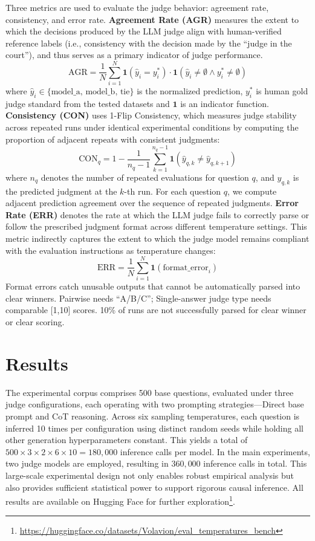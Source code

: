 \documentclass[11pt]{article}
\begin{document}
Three metrics are used to evaluate the judge behavior: agreement rate, consistency, and error rate. 
\textbf{Agreement Rate (AGR)} measures the extent to which the decisions produced by the LLM judge align with human-verified reference labels (i.e., consistency with the decision made by the ``judge in the court''), and thus serves as a primary indicator of judge performance.
$$
\text{AGR} = \frac{1}{N}\sum_{i=1}^N \mathbf{1}(\hat{y}_i = y_i^*) \cdot \mathbf{1}(\hat{y}_i \neq \emptyset \wedge y_i^* \neq \emptyset)
$$
where $\hat{y}_i\in\{\text{model\_a, model\_b, tie}\}$ is the normalized prediction, $y_i^*$ is human gold judge standard from the tested datasets and $\mathbf{1}$ is an indicator function. \textbf{Consistency (CON)} uses 1-Flip Consistency, which measures judge stability across repeated runs under identical experimental conditions by computing the proportion of adjacent repeats with consistent judgments:
$$
\text{CON}_q = 1 - \frac{1}{n_q-1}\sum_{k=1}^{n_q-1} \mathbf{1}(\hat{y}_{q,k} \neq \hat{y}_{q,k+1})
$$
where \( n_q \) denotes the number of repeated evaluations for question \( q \), and \( \hat{y}_{q,k} \) is the predicted judgment at the \( k \)-th run. For each question \( q \), we compute adjacent prediction agreement over the sequence of repeated judgments. \textbf{Error Rate (ERR)} denotes the rate at which the LLM judge fails to correctly parse or follow the prescribed judgment format across different temperature settings. This metric indirectly captures the extent to which the judge model remains compliant with the evaluation instructions as temperature changes:
$$
\text{ERR} = \frac{1}{N}\sum_{i=1}^N \mathbf{1}(\text{format\_error}_i)
$$
Format errors catch unusable outputs that cannot be automatically parsed into clear winners. Pairwise needs ``A/B/C''; Single-answer judge type needs comparable [1,10] scores. 10\% of runs are not successfully parsed for clear winner or clear scoring.



\section{Results}

The experimental corpus comprises 500 base questions, evaluated under three judge
configurations, each operating with two prompting strategies---Direct base prompt and
CoT reasoning. Across six sampling temperatures, each question
is inferred 10 times per configuration using distinct random seeds while holding
all other generation hyperparameters constant. This yields a total of
\(500 \times 3 \times 2 \times 6 \times 10 = 180{,}000\) inference calls per
model. In the main experiments, two judge models are employed, resulting in \(360{,}000\) inference calls in total. 
This large-scale experimental design not only enables robust empirical analysis but also provides sufficient statistical power to support rigorous causal inference. 
All results are available on Hugging Face for further exploration\footnote{\url{https://huggingface.co/datasets/Volavion/eval_temperatures_bench}}.
\end{document}
